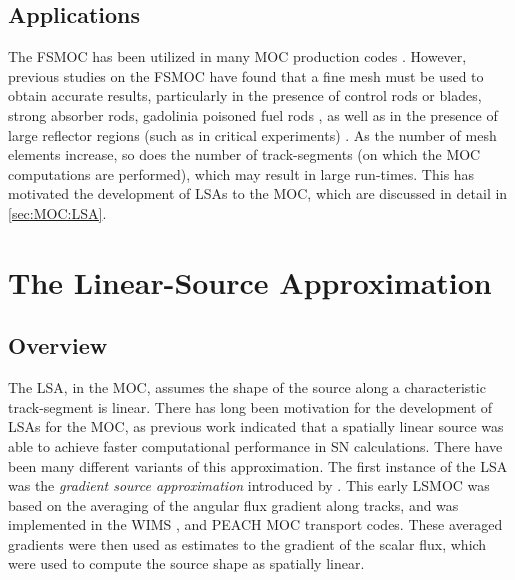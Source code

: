 {{        \subsection{Applications}{\label{ssec:FSA:Applications}
            The \ac{FSMOC} has been utilized in many \ac{MOC} production codes \cite{Halsall1980,Hong1998,Saji2000,Smith2002,Sugimura2006,Masiello2008,Boyd2014,Collins2016}.
            However, previous studies on the \ac{FSMOC} have found that a fine mesh must be used to obtain accurate results, particularly in the presence of control rods or blades, strong absorber rods, gadolinia poisoned fuel rods \cite{Petkov1999}, as well as in the presence of large reflector regions (such as in critical experiments) \cite{Ferrer2016}.
            As the number of mesh elements increase, so does the number of track-segments (on which the \ac{MOC} computations are performed), which may result in large run-times.
            This has motivated the development of \acp{LSA} to the \ac{MOC}, which are discussed in detail in \cref{sec:MOC:LSA}.
        }
    }
    \section{The Linear-Source Approximation}{\label{sec:MOC:LSA}
        \subsection{Overview}{\label{ssec:MOC:LSA:Overview}
            The \acf{LSA}, in the \ac{MOC}, assumes the shape of the source along a characteristic track-segment is linear.
            There has long been motivation for the development of \acp{LSA} for the \ac{MOC}, as previous work \cite{Larsen1980} indicated that a spatially linear source was able to achieve faster computational performance in \ac{SN} calculations.
            There have been many different variants of this approximation.
            The first instance of the \ac{LSA} was the \emph{gradient source approximation} introduced by \citet{Halsall1993}.
            This early \ac{LSMOC} was based on the averaging of the angular flux gradient along tracks, and was implemented in the WIMS \cite{Halsall1993}, and PEACH \cite{Tang2009} \ac{MOC} transport codes.
            These averaged gradients were then used as estimates to the gradient of the scalar flux, which were used to compute the source shape as spatially linear.

}}}

